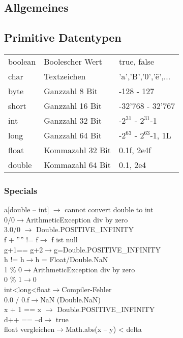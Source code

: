 

\newcommand{\SUBJECT}{}
\newcommand{\TITLE}{Cheat Sheet Objektorientierte Programmierung}



% 

\begin{multicols*}{5}
    \setlength{\columnseprule}{0.4pt}
		\footnotesize
		
% 

\section{Allgemeines}
	\subsection{Primitive Datentypen}
		\begin{tabular}{p{.7cm} | p{2.1cm} | l}
			boolean&Boolescher Wert&true, false\\
			char&Textzeichen&'a','B','0','ë',...\\
			byte&Ganzzahl 8 Bit&-128 - 127\\
			short&Ganzzahl 16 Bit&-32'768 - 32'767\\
			int&Ganzzahl 32 Bit&-$2^{31}$ - $2^{31}$-1\\
			long&Ganzzahl 64 Bit&-$2^{63}$ - $2^{63}$-1, 1L\\
			float&Kommazahl 32 Bit&0.1f, 2e4f\\
			double&Kommazahl 64 Bit&0.1, 2e4\\
		\end{tabular}
		\subsubsection{Specials}
		a[double – int] $\rightarrow$ cannot convert double to int\\
		0/0$\rightarrow$ArithmeticException div by zero\\
		3.0/0 $\rightarrow$ Double.POSITIVE\_INFINITY\\
		f + '''' != f$\rightarrow$ f ist null\\
		g+1== g+2$\rightarrow$g=Double.POSITIVE\_INFINITY\\
		h != h$\rightarrow$h = Float/Double.NaN\\
		1 \% 0$\rightarrow$ArithmeticException div by zero\\
		0 \% 1$\rightarrow$0\\
		int<long<float$\rightarrow$Compiler-Fehler\\
		0.0 / 0.f$\rightarrow$NaN (Double.NaN)\\
		x + 1 == x $\rightarrow$ Double.POSITIVE\_INFINITY\\
		d++ == --d$\rightarrow$ true\\ 
		float vergleichen$\rightarrow$Math.abs(x – y) < delta\\
		\vspace{8pt}

\end{multicols*}
